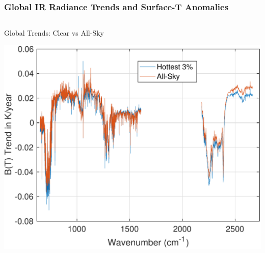 \documentclass[10pt,t]{beamer}
\begin{document}
\begin{frame}
\frametitle{Global IR Radiance Trends and Surface-T Anomalies}  
\vspace{-0.35in}

\begin{columns}
\begin{column}{0.55\columnwidth}
\begin{block}{\footnotesize Global Trends: Clear vs All-Sky}
\vspace{-0.1in}
\begin{center}
\includegraphics[width=\linewidth]{SunClimate2022/global_trends_hottest3pc_and)allsky.pdf}
\end{center}
\end{block}
\end{column}


\end{columns}
\end{frame}
\end{document}
